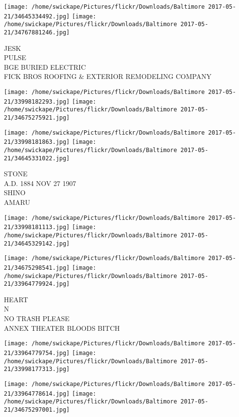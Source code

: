 \documentclass[10pt,letterpaper]{article}
\begin{document}
\texttt{[image: /home/swickape/Pictures/flickr/Downloads/Baltimore 2017-05-21/34645334492.jpg]}
\texttt{[image: /home/swickape/Pictures/flickr/Downloads/Baltimore 2017-05-21/34767881246.jpg]}

JESK\\
PULSE\\
BGE BURIED ELECTRIC\\
FICK BROS ROOFING \& EXTERIOR REMODELING COMPANY\\
\pagebreak

\texttt{[image: /home/swickape/Pictures/flickr/Downloads/Baltimore 2017-05-21/33998182293.jpg]}
\texttt{[image: /home/swickape/Pictures/flickr/Downloads/Baltimore 2017-05-21/34675275921.jpg]}

\texttt{[image: /home/swickape/Pictures/flickr/Downloads/Baltimore 2017-05-21/33998181863.jpg]}
\texttt{[image: /home/swickape/Pictures/flickr/Downloads/Baltimore 2017-05-21/34645331022.jpg]}

STONE\\
A.D. 1884 NOV 27 1907\\
SHINO\\
AMARU\\
\pagebreak

\texttt{[image: /home/swickape/Pictures/flickr/Downloads/Baltimore 2017-05-21/33998181113.jpg]}
\texttt{[image: /home/swickape/Pictures/flickr/Downloads/Baltimore 2017-05-21/34645329142.jpg]}

\texttt{[image: /home/swickape/Pictures/flickr/Downloads/Baltimore 2017-05-21/34675298541.jpg]}
\texttt{[image: /home/swickape/Pictures/flickr/Downloads/Baltimore 2017-05-21/33964779924.jpg]}

HEART\\
N\\
NO TRASH PLEASE\\
ANNEX THEATER BLOODS BITCH\\
\pagebreak

\texttt{[image: /home/swickape/Pictures/flickr/Downloads/Baltimore 2017-05-21/33964779754.jpg]}
\texttt{[image: /home/swickape/Pictures/flickr/Downloads/Baltimore 2017-05-21/33998177313.jpg]}

\texttt{[image: /home/swickape/Pictures/flickr/Downloads/Baltimore 2017-05-21/33964778614.jpg]}
\texttt{[image: /home/swickape/Pictures/flickr/Downloads/Baltimore 2017-05-21/34675297001.jpg]}
\end{document}
